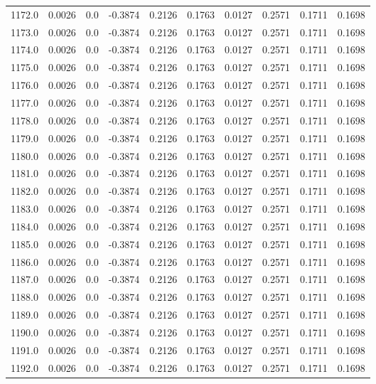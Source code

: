 \begin{longtable}{lrrrrrrrrr}
1172.0 & 0.0026 & 0.0 & -0.3874 & 0.2126 & 0.1763 & 0.0127 & 0.2571 & 0.1711 & 0.1698 \\
1173.0 & 0.0026 & 0.0 & -0.3874 & 0.2126 & 0.1763 & 0.0127 & 0.2571 & 0.1711 & 0.1698 \\
1174.0 & 0.0026 & 0.0 & -0.3874 & 0.2126 & 0.1763 & 0.0127 & 0.2571 & 0.1711 & 0.1698 \\
1175.0 & 0.0026 & 0.0 & -0.3874 & 0.2126 & 0.1763 & 0.0127 & 0.2571 & 0.1711 & 0.1698 \\
1176.0 & 0.0026 & 0.0 & -0.3874 & 0.2126 & 0.1763 & 0.0127 & 0.2571 & 0.1711 & 0.1698 \\
1177.0 & 0.0026 & 0.0 & -0.3874 & 0.2126 & 0.1763 & 0.0127 & 0.2571 & 0.1711 & 0.1698 \\
1178.0 & 0.0026 & 0.0 & -0.3874 & 0.2126 & 0.1763 & 0.0127 & 0.2571 & 0.1711 & 0.1698 \\
1179.0 & 0.0026 & 0.0 & -0.3874 & 0.2126 & 0.1763 & 0.0127 & 0.2571 & 0.1711 & 0.1698 \\
1180.0 & 0.0026 & 0.0 & -0.3874 & 0.2126 & 0.1763 & 0.0127 & 0.2571 & 0.1711 & 0.1698 \\
1181.0 & 0.0026 & 0.0 & -0.3874 & 0.2126 & 0.1763 & 0.0127 & 0.2571 & 0.1711 & 0.1698 \\
1182.0 & 0.0026 & 0.0 & -0.3874 & 0.2126 & 0.1763 & 0.0127 & 0.2571 & 0.1711 & 0.1698 \\
1183.0 & 0.0026 & 0.0 & -0.3874 & 0.2126 & 0.1763 & 0.0127 & 0.2571 & 0.1711 & 0.1698 \\
1184.0 & 0.0026 & 0.0 & -0.3874 & 0.2126 & 0.1763 & 0.0127 & 0.2571 & 0.1711 & 0.1698 \\
1185.0 & 0.0026 & 0.0 & -0.3874 & 0.2126 & 0.1763 & 0.0127 & 0.2571 & 0.1711 & 0.1698 \\
1186.0 & 0.0026 & 0.0 & -0.3874 & 0.2126 & 0.1763 & 0.0127 & 0.2571 & 0.1711 & 0.1698 \\
1187.0 & 0.0026 & 0.0 & -0.3874 & 0.2126 & 0.1763 & 0.0127 & 0.2571 & 0.1711 & 0.1698 \\
1188.0 & 0.0026 & 0.0 & -0.3874 & 0.2126 & 0.1763 & 0.0127 & 0.2571 & 0.1711 & 0.1698 \\
1189.0 & 0.0026 & 0.0 & -0.3874 & 0.2126 & 0.1763 & 0.0127 & 0.2571 & 0.1711 & 0.1698 \\
1190.0 & 0.0026 & 0.0 & -0.3874 & 0.2126 & 0.1763 & 0.0127 & 0.2571 & 0.1711 & 0.1698 \\
1191.0 & 0.0026 & 0.0 & -0.3874 & 0.2126 & 0.1763 & 0.0127 & 0.2571 & 0.1711 & 0.1698 \\
1192.0 & 0.0026 & 0.0 & -0.3874 & 0.2126 & 0.1763 & 0.0127 & 0.2571 & 0.1711 & 0.1698 \\

\end{longtable}
